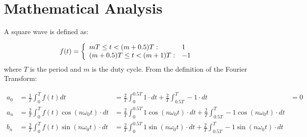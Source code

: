\documentclass[main.tex]{subfile}
\begin{document}
\section{Mathematical Analysis}
\label{sec:mathematical_analysis}

A square wave is defined as:

\begin{align}
  f(t) = \left\{
    \begin{array}{l l}
      mT \leq t < (m + 0.5)T: & 1
      \\(m + 0.5)T \leq t < (m+1)T: & -1
    \end{array}
  \right.
\end{align}
where $T$ is the period and $m$ is the duty cycle. From the definition of the
Fourier Transform:

\begin{align}
  a_0 &= \frac{1}{T}\int_0^T f(t) dt
  &= \frac{2}{T}\int_0^{0.5T} 1 \cdot dt + \frac{2}{T}\int_{0.5T}^{T} -1 \cdot dt
  &= 0
  \\a_n &= \frac{2}{T}\int_0^T f(t) \cos(n\omega_0t) \cdot dt
  &= \frac{2}{T} \int_0^{0.5T} 1 \cos(n\omega_0t) \cdot dt
  + \frac{2}{T} \int_{0.5T}^{T} -1 \cos(n\omega_0t) \cdot dt
  \\b_n &= \frac{2}{T}\int_0^T f(t) \sin(n\omega_0t) \cdot dt
  &= \frac{2}{T} \int_0^{0.5T} 1 \sin(n\omega_0t) \cdot dt
  + \frac{2}{T} \int_{0.5T}^{T} -1 \sin(n\omega_0t) \cdot dt
\end{align}

\end{document}
